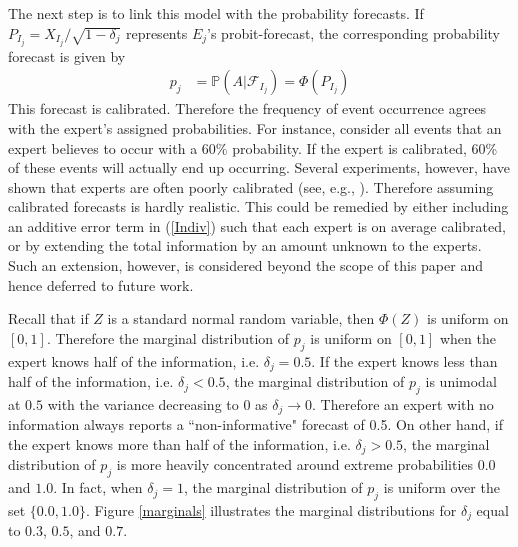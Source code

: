 \documentclass[11pt,twoside]{article}
\renewcommand{\P}{\mathbb{P}}
\theoremstyle{definition}
\theoremstyle{definition}
\begin{document}
The next step is to link this model with the probability forecasts. If  $P_{I_j} = X_{I_j}/\sqrt{1-\delta_j}$ represents $E_j$'s probit-forecast, the corresponding probability forecast is given by
\begin{align}
p_j &= \P\left(A | \mathcal{F}_{I_j}\right) = \Phi\left( P_{I_j}\right) \label{Indiv}
\end{align}
This forecast is calibrated. Therefore the frequency of event occurrence agrees with the expert's assigned probabilities. For instance, consider all events that an expert believes to occur with a 60\% probability. If the expert is calibrated, 60\% of these events will actually end up occurring. Several experiments, however, have shown that experts are often poorly calibrated (see, e.g., \cite{cooke1991experts, shlyakhter1994quantifying}). Therefore assuming calibrated forecasts is hardly realistic. This could be remedied by  either including an additive error term in (\ref{Indiv}) such that each expert is on average calibrated, or by extending the total information by an amount unknown to the experts. Such an extension, however, is considered beyond the scope of this paper and hence deferred to future work. 

Recall that if $Z$ is a standard normal random variable, then $\Phi(Z)$ is uniform on $[0,1]$. Therefore the marginal distribution of $p_j$ is uniform on $[0,1]$ when the expert knows half of the information, i.e. $\delta_j = 0.5$. If the expert knows less than half of the information, i.e. $\delta_j < 0.5$, the marginal distribution of $p_j$ is unimodal at $0.5$ with the variance decreasing to 0 as $\delta_j \to 0$. Therefore an expert with no information always reports a ``non-informative" forecast of 0.5. On other hand, if the expert knows more than half of the information, i.e. $\delta_j > 0.5$, the marginal  distribution of $p_j$ is more heavily concentrated around extreme probabilities $0.0$ and $1.0$. In fact, when $\delta_j = 1$, the marginal distribution of $p_j$ is uniform over the set $\{0.0,1.0\}$. Figure \ref{marginals} illustrates the marginal distributions for $\delta_j$ equal to $0.3$, $0.5$, and $0.7$. 
\end{document}
